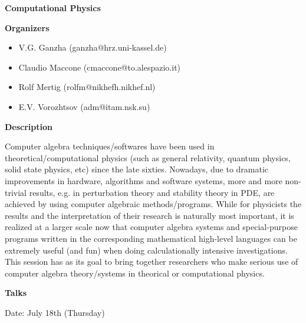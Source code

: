 \begin{center}
{\LARGE \bf Computational Physics
}
\end{center}
\bigskip

\noindent
{\bf Organizers}

\begin{itemize}

\item
V.G. Ganzha (ganzha@hrz.uni-kassel.de)

\item
Claudio Maccone (cmaccone@to.alespazio.it)

\item
Rolf Mertig (rolfm@nikhefh.nikhef.nl) 

\item
E.V. Vorozhtsov (adm@itam.nsk.su)

\end{itemize}

\medskip

\bigskip

\noindent
{\bf Description}
\medskip

Computer algebra techniques/softwares have been used in theoretical/computational physics (such
as general relativity, quantum physics, solid state physics, etc) since the late sixties. Nowadays, due
to dramatic improvements in hardware, algorithms and software systems, more and more
non-trivial results, e.g. in perturbation theory and stability theory in PDE, are achieved by using
computer algebraic methods/programs. While for physicists the results and the interpretation of
their research is naturally most important, it is realized at a larger scale now that computer algebra
systems and special-purpose programs written in the corresponding mathematical high-level
languages can be extremely useful (and fun) when doing calculationally intensive investigations.
This session has as its goal to bring together researchers who make serious use of computer algebra
theory/systems in theorical or computational physics. 

\bigskip
\noindent
{\bf Talks}
\medskip

Date: July 18th (Thursday) 


